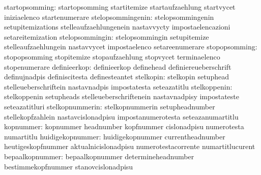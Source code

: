                   startopsomming: startopsomming                   startitemize
                                  startaufzaehlung                 startvycet
                                  iniziaelenco                     startenumerare
               stelopsommingenin: stelopsommingenin                setupitemizations
                                  stelleaufzaehlungenein           nastavvycty
                                  impostaelencazioni               setareitemization
                 stelopsommingin: stelopsommingin                  setupitemize
                                  stelleaufzaehlungein             nastavvycet
                                  impostaelenco                    setareenumerare
                   stopopsomming: stopopsomming                    stopitemize
                                  stopaufzaehlung                  stopvycet
                                  terminaelenco                    stopenumerare
                    definieerkop: definieerkop                     definehead
                                  definiereueberschrift            definujnadpis
                                  definiscitesta                   definesteantet
                       stelkopin: stelkopin                        setuphead
                                  stelleueberschriftein            nastavnadpis
                                  impostatesta                     seteazatitlu
                    stelkoppenin: stelkoppenin                     setupheads
                                  stelleueberschriftenein          nastavnadpisy
                                  impostateste                     seteazatitluri
                 stelkopnummerin: stelkopnummerin                  setupheadnumber
                                  stellekopfzahlein                nastavcislonadpisu
                                  impostanumerotesta               seteazanumartitlu
                       kopnummer: kopnummer                        headnumber
                                  kopfnummer                       cislonadpisu
                                  numerotesta                      numartitlu
                huidigekopnummer: huidigekopnummer                 currentheadnumber
                                  heutigeskopfnummer               aktualnicislonadpisu
                                  numerotestacorrente              numartitlucurent
                 bepaalkopnummer: bepaalkopnummer                  determineheadnumber
                                  bestimmekopfnummer               stanovcislonadpisu
